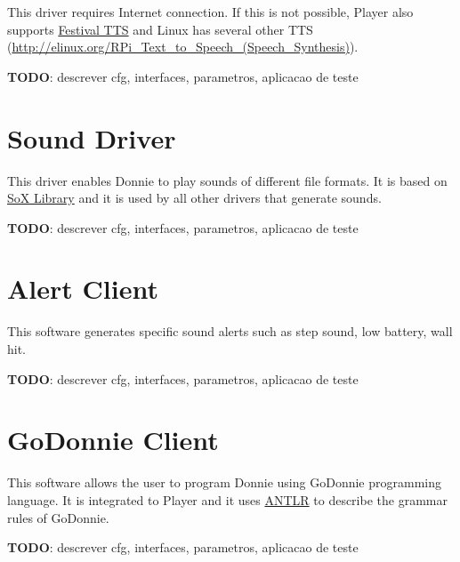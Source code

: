 This driver requires Internet connection. If this is not possible, Player also supports \href{http://playerstage.sourceforge.net/doc/Player-svn/player/group__driver__festival.html}{Festival TTS} and Linux has several other TTS (\url{http://elinux.org/RPi_Text_to_Speech_(Speech_Synthesis)}).

{\bf TODO}: descrever cfg, interfaces, parametros, aplicacao de teste

\section{Sound Driver}
\label{sec:player_sound}

This driver enables Donnie to play sounds of different file formats. It is based on \href{http://sox.sourceforge.net/libsox.html}{SoX Library} and it is used by all other drivers that generate sounds.

{\bf TODO}: descrever cfg, interfaces, parametros, aplicacao de teste

\section{Alert Client}
\label{sec:player_alert}


This software generates specific sound alerts such as step sound, low battery, wall hit. 

{\bf TODO}: descrever cfg, interfaces, parametros, aplicacao de teste

\section{GoDonnie Client}
\label{sec:player_godonnie}


This software allows the user to program Donnie using GoDonnie programming language. 
It is integrated to Player and it uses \href{www.antlr.org/}{ANTLR} to describe the grammar rules of GoDonnie.


{\bf TODO}: descrever cfg, interfaces, parametros, aplicacao de teste
